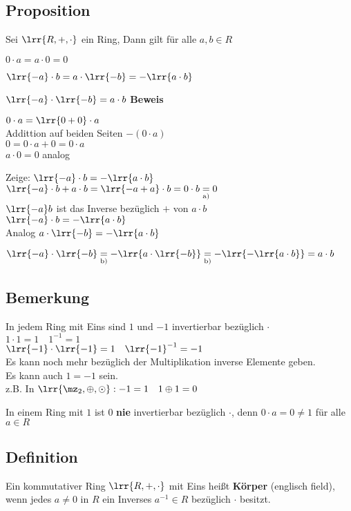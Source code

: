 \subsection{Proposition}
	Sei $\lrr{R,+,\cdot}$ ein Ring, Dann gilt für alle $a,b\in R$
		\item $0\cdot a=a\cdot 0=0$
		\item $\lrr{-a}\cdot b=a\cdot\lrr{-b}=-\lrr{a\cdot b}$
		\item $\lrr{-a}\cdot\lrr{-b}=a\cdot b$
	\subExEnd
	\textbf{Beweis}
		\item $0\cdot a =\lrr{0+0}\cdot a$ \\
			Addittion auf beiden Seiten $-(0\cdot a)$\\
			$0=0\cdot a+0=0\cdot a$\\
			$a\cdot 0=0$ analog
		\item Zeige: $\lrr{-a}\cdot b=-\lrr{a\cdot b}$\\
			$\lrr{-a}\cdot b+a\cdot b=\lrr{-a+a}\cdot b = 0\cdot b \underset{\mbox{\scriptsize a)}}{=} 0$\\
			$\lrr{-a}b$ ist das Inverse bezüglich $+$ von $a\cdot b$\\
			$\lrr{-a}\cdot b=-\lrr{a\cdot b}$\\
			Analog $a\cdot\lrr{-b}=-\lrr{a\cdot b}$
		\item $\lrr{-a}\cdot\lrr{-b}\underset{\mbox{\scriptsize b)}}{=}-\lrr{a\cdot\lrr{-b}}\underset{\mbox{\scriptsize b)}}{=}-\lrr{-\lrr{a\cdot b}}=a\cdot b$
	\subExEnd
\subsection{Bemerkung}
		\item In jedem Ring mit Eins sind $1$ und $-1$ invertierbar bezüglich $\cdot$\\
			$1\cdot 1=1\quad 1^{-1}=1$\\
			$\lrr{-1}\cdot\lrr{-1}=1\quad\lrr{-1}^{-1}=-1$\\
			Es kann noch mehr bezüglich der Multiplikation inverse Elemente geben.\\
			Es kann auch $1=-1$ sein.\\
			z.B. In $\lrr{\mz_2,\oplus,\odot}: -1=1\quad 1\oplus 1=0$
		\item In einem Ring mit $1$ ist $0$ \textbf{nie} invertierbar bezüglich $\cdot$, denn $0\cdot a=0\neq 1$ für alle $a\in R$
	\subExEnd
\subsection{Definition}
	Ein kommutativer Ring $\lrr{R,+,\cdot}$ mit Eins heißt \textbf{Körper} (englisch field), wenn jedes $a\neq 0$ in $R$ ein Inverses $a^{-1}\in R$ bezüglich $\cdot$ besitzt.

